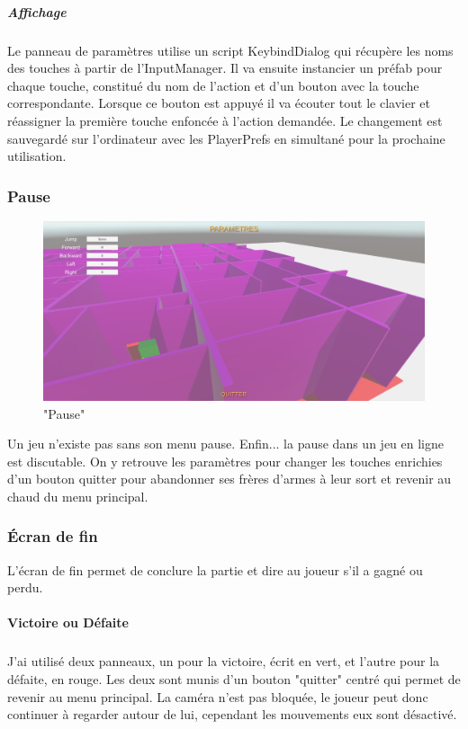\documentclass{article}
\begin{document}
\subparagraph{Affichage}
Le panneau de paramètres utilise un script KeybindDialog qui récupère les noms des touches à partir de l'InputManager. Il va ensuite instancier un préfab pour chaque touche, constitué du nom de l'action et d'un bouton avec la touche correspondante. Lorsque ce bouton est appuyé il va écouter tout le clavier et réassigner la première touche enfoncée à l'action demandée. Le changement est sauvegardé sur l'ordinateur avec les PlayerPrefs en simultané pour la prochaine utilisation.

\subsubsection{Pause}

\par\vspace{0.5cm}
\begin{figure}[!h]
    \centering
    \includegraphics[width=1\textwidth]{Pause.PNG}
    \caption{"Pause"}
    \label{Pause}
\end{figure}{}

Un jeu n'existe pas sans son menu pause. Enfin... la pause dans un jeu en ligne est discutable.
On y retrouve les paramètres pour changer les touches enrichies d'un bouton quitter pour abandonner ses frères d'armes à leur sort et revenir au chaud du menu principal.

\newpage
\subsubsection{Écran de fin}

L'écran de fin permet de conclure la partie et dire au joueur s'il a gagné ou perdu.

\paragraph{Victoire ou Défaite}
\subparagraph{}
J'ai utilisé deux panneaux, un pour la victoire, écrit en vert, et l'autre pour la défaite, en rouge.
Les deux sont munis d'un bouton "quitter" centré qui permet de revenir au menu principal.
La caméra n'est pas bloquée, le joueur peut donc continuer à regarder autour de lui, cependant les mouvements eux sont désactivé.
\end{document}
